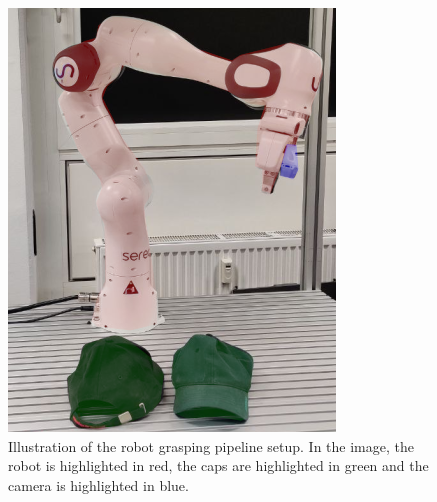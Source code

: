 \begin{figure}[htb]
    \centering
    \includegraphics[scale=0.3]{images/franka.png}
    \caption{Illustration of the robot grasping pipeline setup. In the image, the robot is highlighted in red, the caps are highlighted in green and the camera is highlighted in blue.}
    \label{fig:robot_setup}
\end{figure}




